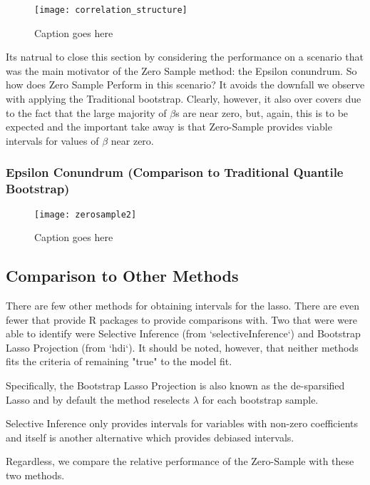 \begin{figure}
  \texttt{[image: correlation\_structure]}
  \caption{\label{Fig:correlation_structure} Caption goes here}
\end{figure}

Its natrual to close this section by considering the performance on a scenario that was the main motivator of the Zero Sample method: the Epsilon conundrum. So how does Zero Sample Perform in this scenario? It avoids the downfall we observe with applying the Traditional bootstrap. Clearly, however, it also over covers due to the fact that the large majority of $\beta$s are near zero, but, again, this is to be expected and the important take away is that Zero-Sample provides viable intervals for values of $\beta$ near zero.

\subsubsection{Epsilon Conundrum (Comparison to Traditional Quantile Bootstrap)}

\begin{figure}
  \texttt{[image: zerosample2]}
  \caption{\label{Fig:zerosample2} Caption goes here}
\end{figure}

\subsection{Comparison to Other Methods}

There are few other methods for obtaining intervals for the lasso. There are even fewer that provide R packages to provide comparisons with. Two that were were able to identify were Selective Inference (from `selectiveInference`) and Bootstrap Lasso Projection (from `hdi`). It should be noted, however, that neither methods fits the criteria of remaining "true" to the model fit.

Specifically, the Bootstrap Lasso Projection is also known as the de-sparsified Lasso and by default the method reselects $\lambda$ for each bootstrap sample.

Selective Inference only provides intervals for variables with non-zero coefficients and itself is another alternative which provides debiased intervals.

Regardless, we compare the relative performance of the Zero-Sample with these two methods.

